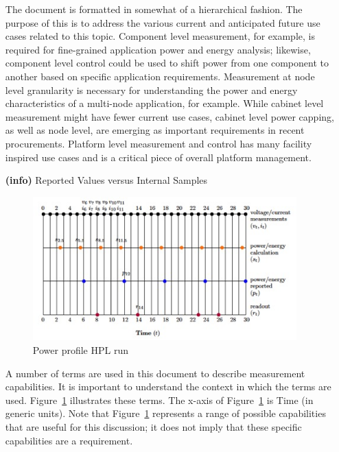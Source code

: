 \begin{itemize}
The document is formatted in somewhat of a hierarchical fashion. The purpose of this 
is to address the various current and anticipated future use cases related to this topic. 
Component level measurement, for example, is required for fine-grained application 
power and energy analysis; likewise, component level control could be used to 
shift power from one component to another based on specific application requirements. 
Measurement at node level granularity is necessary for understanding the power and 
energy characteristics of a multi-node application, for example. While cabinet level 
measurement might have fewer current use cases, cabinet level power capping, as well as 
node level, are emerging as important requirements in recent procurements. Platform level 
measurement and control has many facility inspired use cases and is a critical piece of 
overall platform management.

\item[{\textbf{(info)}}]
Reported Values versus Internal Samples

\begin{figure}[htbp]
\centering
\includegraphics[width=4in]{fig1}
\caption{Power profile HPL run}
\label{fig:powprof}
\end{figure}

A number of terms are used in this document to describe measurement capabilities. 
It is important to understand the context in which the terms are used. 
Figure~\ref{fig:powprof} illustrates these terms. The x-axis of Figure~\ref{fig:powprof} 
is Time (in generic units). Note that Figure~\ref{fig:powprof} represents a range of 
possible capabilities that are useful for this discussion; it does not imply that 
these specific capabilities are a requirement.


\end{itemize}
